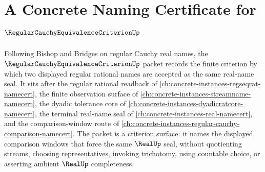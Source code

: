 \chapter{A Concrete Naming Certificate for $\RegularCauchyEquivalenceCriterionUp$}
\label{ch:concrete-instances-regular-cauchy-equivalence-criterion-namecert}

Following Bishop and Bridges on regular Cauchy real names, the $\RegularCauchyEquivalenceCriterionUp$ packet records the finite criterion by which two displayed regular rational names are accepted as the same real-name seal. It sits after the regular rational readback of \autoref{ch:concrete-instances-regseqrat-namecert}, the finite observation surface of \autoref{ch:concrete-instances-streamname-namecert}, the dyadic tolerance core of \autoref{ch:concrete-instances-dyadicratcore-namecert}, the terminal real-name seal of \autoref{ch:concrete-instances-real-namecert}, and the comparison-window route of \autoref{ch:concrete-instances-regular-cauchy-comparison-namecert}. The packet is a criterion surface: it names the displayed comparison windows that force the same $\RealUp$ seal, without quotienting streams, choosing representatives, invoking trichotomy, using countable choice, or asserting ambient $\RealUp$ completeness.

